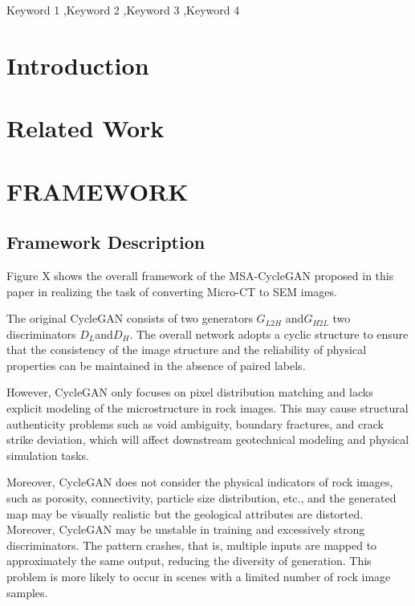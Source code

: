 \documentclass[a4paper,fleqn]{cas-sc}
\begin{document}

\begin{keywords}
Keyword 1 \sep Keyword 2 \sep Keyword 3 \sep Keyword 4
\end{keywords}

\maketitle 

\printcredits

\doublespacing

\section{Introduction}
\section{Related Work}
\section{FRAMEWORK}

\subsection{Framework Description}
Figure X shows the overall framework of the MSA-CycleGAN proposed in this paper in realizing the task of converting Micro-CT to SEM images.

The original CycleGAN consists of two generators $ G_{L2H}$ and$ G_{H2L}$ two discriminators $ D_{L}$and$ D_{H}$. The overall network adopts a cyclic structure to ensure that the consistency of the image structure and the reliability of physical properties can be maintained in the absence of paired labels.

However, CycleGAN only focuses on pixel distribution matching and lacks explicit modeling of the microstructure in rock images. This may cause structural authenticity problems such as void ambiguity, boundary fractures, and crack strike deviation, which will affect downstream geotechnical modeling and physical simulation tasks.

Moreover, CycleGAN does not consider the physical indicators of rock images, such as porosity, connectivity, particle size distribution, etc., and the generated map may be visually realistic but the geological attributes are distorted. Moreover, CycleGAN may be unstable in training and excessively strong discriminators. The pattern crashes, that is, multiple inputs are mapped to approximately the same output, reducing the diversity of generation. This problem is more likely to occur in scenes with a limited number of rock image samples.
\end{document}
